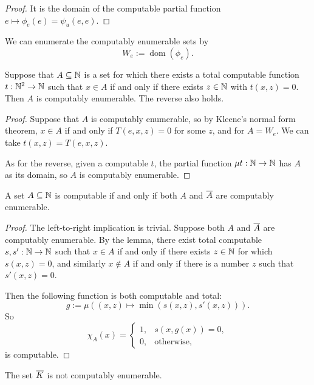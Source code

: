 \begin{proof}
  It is the domain of the computable partial function $e \mapsto \phi_e(e) =
  \psi_u(e,e)$.
\end{proof}

We can enumerate the computably enumerable sets by
\[
  W_e := \operatorname{dom}(\phi_e).
\]

\begin{lemma}
  Suppose that $A \subseteq \mathbb{N}$ is a set for which there exists a total
  computable function $t: \mathbb{N}^2 \to \mathbb{N}$ such that $x \in A$ if and only if there
  exists $z \in \mathbb{N}$ with $t(x,z) = 0$.
  Then $A$ is computably enumerable.
  The reverse also holds.
\end{lemma}

\begin{proof}
  Suppose that $A$ is computably enumerable, so by Kleene's normal form theorem,
  $x \in A$ if and only if $T(e,x,z) = 0$ for some $z$, and for $A = W_e$.
  We can take $t(x,z) = T(e,x,z)$.

  As for the reverse, given a computable $t$, the partial function
  $\mu t: \mathbb{N} \to \mathbb{N}$  has $A$ as its domain, so $A$ is computably enumerable.
\end{proof}

\begin{theorem}
  A set $A \subseteq \mathbb{N}$ is computable if and only if both $A$ and $\overline{A}$ are
  computably enumerable.
\end{theorem}

\begin{proof}
  The left-to-right implication is trivial.
  Suppose both $A$ and $\overline{A}$ are computably enumerable.
  By the lemma, there exist total computable $s,s': \mathbb{N} \to \mathbb{N}$ such that $x \in
  A$ if and only if there exists $z \in \mathbb{N}$ for which $s(x,z) = 0$, and
  similarly $x \notin A$ if and only if there is a number $z$ such that $s'(x,z)
  = 0$.

  Then the following function is both computable and total:
  \[
	g := \mu ((x,z) \mapsto \min(s(x,z), s'(x,z))).
  \]
  So
  \[
	\chi_A(x) =
	\begin{cases}
	  1, & s(x,g(x)) = 0, \\
	  0, & \text{otherwise},
	\end{cases}
  \]
  is computable.
\end{proof}

\begin{corollary}
  The set $\overline{K}$ is not computably enumerable.
\end{corollary}

